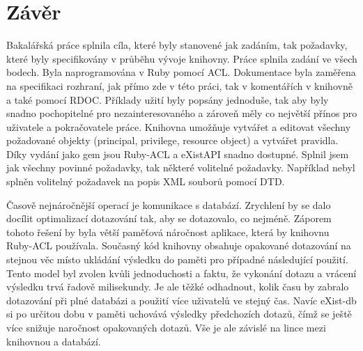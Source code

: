 \chapter{Závěr}

Bakalářská práce splnila cíla, které byly stanovené jak zadáním, tak požadavky, které byly specifikovány v průběhu vývoje knihovny. Práce splnila zadání ve všech bodech. Byla naprogramována v Ruby pomocí ACL. Dokumentace byla zaměřena na specifikaci rozhraní, jak přímo zde v této práci, tak v komentářích v knihovně a také pomocí RDOC. Příklady užití byly popsány jednoduše, tak aby byly snadno pochopitelné pro nezainteresovaného a zároveň měly co největší přínos pro uživatele a pokračovatele práce. Knihovna umožňuje vytvářet a editovat všechny požadované objekty (principal, privilege, resource object) a vytvářet pravidla. Díky vydání jako gem jsou Ruby-ACL a eXistAPI snadno dostupné. Splnil jsem jak všechny povinné požadavky, tak některé volitelné požadavky.  Například nebyl splněn volitelný požadavek na popis XML souborů pomocí DTD.

Časově nejnáročnější operací je komunikace s databází. Zrychlení by se dalo docílit optimalizací dotazování tak, aby se dotazovalo, co nejméně. Záporem tohoto řešení by byla větší paměťová náročnost aplikace, která by knihovnu Ruby-ACL používala. Současný kód knihovny obsahuje opakované dotazování na stejnou věc místo ukládání výsledku do paměti pro případné následující použití. Tento model byl zvolen kvůli jednoduchosti a faktu, že vykonání dotazu a vrácení výsledku trvá řadově milisekundy. Je ale těžké odhadnout, kolik času by zabralo dotazování při plné databázi a použití více uživatelů ve stejný čas. Navíc eXist-db si po určitou dobu v paměti uchovává výsledky předchozích dotazů, čímž se ještě více snižuje naročnost opakovaných dotazů. Vše je ale závislé na lince mezi knihovnou a databází.
